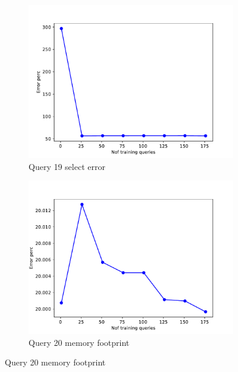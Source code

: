 \begin{figure}[!htb]
    \begin{subfigure}[t]{0.5\textwidth}
      \includegraphics[scale=0.4]{figs/tpch10/tpch10_sel19_error.pdf}
      \caption{Query 19 select error}
      \label{fig:tpch_sel19}
    \end{subfigure}
    \begin{subfigure}[t]{0.5\textwidth}
      \includegraphics[scale=0.4]{figs/tpch10/tpch10_sel20_error.pdf}
      \caption{Query 20 memory footprint}
      \label{fig:tpch_sel20}
     \end{subfigure}


\end{figure}
